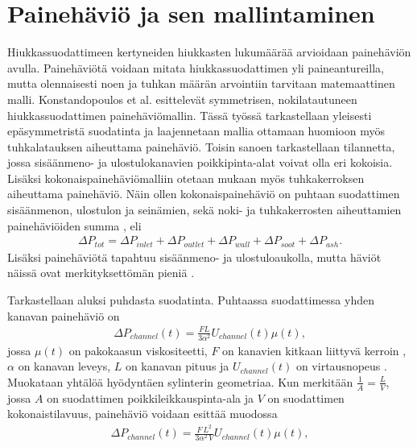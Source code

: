 \section{Painehäviö ja sen mallintaminen}
Hiukkassuodattimeen kertyneiden hiukkasten lukumäärää arvioidaan painehäviön avulla. Painehäviötä voidaan mitata hiukkassuodattimen yli paineantureilla, mutta olennaisesti noen ja tuhkan määrän arvointiin tarvitaan matemaattinen malli.
Konstandopoulos et al.  \cite{Konstandopoulos2000} esittelevät symmetrisen, nokilatautuneen hiukkassuodattimen painehäviömallin. Tässä työssä tarkastellaan yleisesti epäsymmetristä suodatinta ja laajennetaan mallia ottamaan huomioon myös tuhkalatauksen aiheuttama painehäviö. Toisin sanoen tarkastellaan tilannetta, jossa sisäänmeno- ja ulostulokanavien poikkipinta-alat voivat olla eri kokoisia. Lisäksi kokonaispainehäviömalliin otetaan mukaan myös tuhkakerroksen aiheuttama painehäviö. Näin ollen kokonaispainehäviö on puhtaan suodattimen sisäänmenon, ulostulon ja seinämien, sekä noki- ja tuhkakerrosten aiheuttamien painehäviöiden summa \cite{Konstandopoulos2000}\cite{Konstandopoulos2008}, eli
\begin{align}\label{eq:deltaP_total}
    \Delta P_{tot} = \Delta P_{inlet} +  \Delta P_{outlet} + \Delta P_{wall} + \Delta P_{soot} +  \Delta P_{ash}.
\end{align}
Lisäksi painehäviötä tapahtuu sisäänmeno- ja ulostuloaukolla, mutta häviöt näissä ovat merkityksettömän pieniä \cite{Konstandopoulos2000}.

Tarkastellaan aluksi puhdasta suodatinta. Puhtaassa suodattimessa yhden kanavan painehäviö on
\begin{align}
    \Delta P_{channel}(t) = \frac{ FL}{3 \alpha^2} U_{channel}(t)\mu(t),
\end{align}
jossa \(\mu(t) \) on pakokaasun viskositeetti, \(F\) on kanavien kitkaan liittyvä kerroin \cite{dieselnet_wall_flow_monolith}, \(\alpha\) on kanavan leveys, \(L\) on kanavan pituus ja \(U_{channel}(t)\) on virtausnopeus \cite{Konstandopoulos2000}.
Muokataan yhtälöä hyödyntäen sylinterin geometriaa. Kun merkitään \(\frac{1}{A} = \frac{L}{V}\), jossa \(A\) on suodattimen poikkileikkauspinta-ala ja \(V\) on suodattimen kokonaistilavuus, painehäviö voidaan esittää muodossa
\begin{align}\label{eq:clean_channel_pd}
    \Delta P_{channel}(t) = \frac{ F \,L^2}{3 \alpha^2 \,V} U_{channel}(t)\mu(t),
\end{align}

